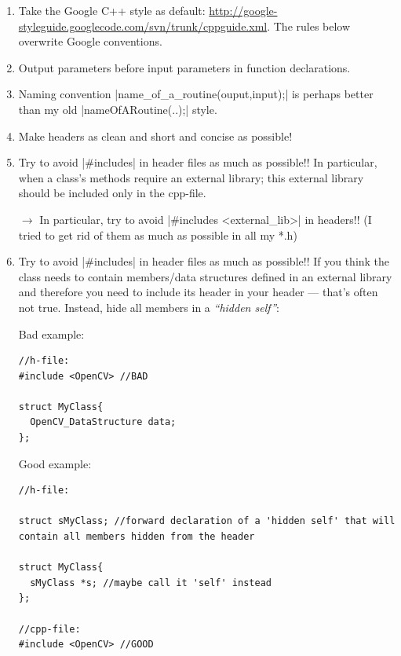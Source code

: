 \begin{enumerate}
\item Take the Google C++ style as default:
  \url{http://google-styleguide.googlecode.com/svn/trunk/cppguide.xml}.
  The rules below overwrite Google conventions.

\item Output parameters before input parameters in function declarations.

\item Naming convention |name_of_a_routine(ouput,input);| is
  perhaps better than my old |nameOfARoutine(..);| style.

\item Make headers as clean and short and concise as possible!

\item Try to avoid |#includes| in header files as much as possible!!
  In particular, when a class's methods require an external library;
  this external library should be included only in the cpp-file.

 $\to$ In particular, try to avoid |#includes <external_lib>| in headers!! (I
 tried to get rid of them as much as possible in all my *.h)

\item Try to avoid |#includes| in header files as much as possible!!
  If
  you think the class needs to contain members/data structures defined
  in an external library and therefore you need to include its header
  in your header --- that's often not true. Instead, hide all members
  in a \emph{``hidden self''}:

Bad example:

\begin{code}
\begin{verbatim}
//h-file:
#include <OpenCV> //BAD

struct MyClass{
  OpenCV_DataStructure data;
};
\end{verbatim}
\end{code}

Good example:

\begin{code}
\begin{verbatim}
//h-file:

struct sMyClass; //forward declaration of a 'hidden self' that will
contain all members hidden from the header

struct MyClass{
  sMyClass *s; //maybe call it 'self' instead
};

//cpp-file:
#include <OpenCV> //GOOD


\end{verbatim}
\end{code}
\end{enumerate}
